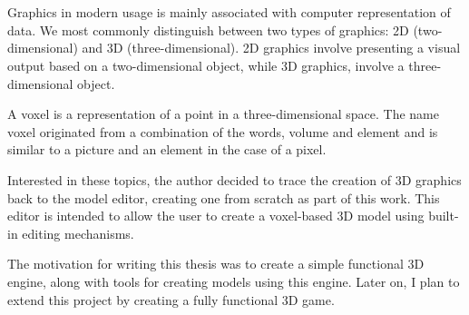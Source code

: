 \cleardoublepage
\chapter*{}
 

Graphics in modern usage is mainly associated with computer representation of data.
We most commonly distinguish between two types of graphics: 2D (two-dimensional)
and 3D (three-dimensional). 2D graphics involve presenting a visual output based on a
two-dimensional object, while 3D graphics, involve a three-dimensional object.

A voxel is a representation of a point in a three-dimensional space. The name voxel originated from a combination of the words, volume and element and is similar to a picture and an element in the case of a pixel.

Interested in these topics, the author decided to trace the creation of 3D graphics back
to the model editor, creating one from scratch as part of this work. This editor is intended to allow the user to create a voxel-based 3D model using built-in editing mechanisms.

The motivation for writing this thesis was to create a simple functional 3D engine,
along with tools for creating models using this engine. Later on, I plan to extend this project by creating a fully functional 3D game.